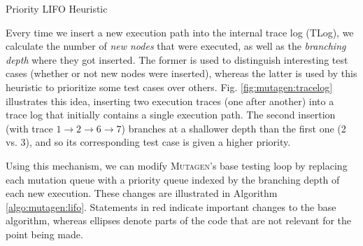 \documentclass[sigconf,review,anonymous]{acmart}
\newcommand{\mutagen}{\textsc{Mutagen}\xspace}
\begin{document}
\begin{algorithm}[t]
  \SetAlgoLined
  \DontPrintSemicolon

\caption{\label{algo:mutagen:lifo}Priority LIFO Heuristic}
\end{algorithm}


Every time we insert a new execution path into the internal trace log (TLog), we
calculate the number of \emph{new nodes} that were executed, as well as the
\emph{branching depth} where they got inserted.
%
The former is used to distinguish interesting test cases (whether or not new
nodes were inserted), whereas the latter is used by this heuristic to prioritize
some test cases over others.
%
Fig. \ref{fig:mutagen:tracelog} illustrates this idea, inserting two execution
traces (one after another) into a trace log that initially contains a single
execution path.
%
The second insertion (with trace $1 \rightarrow 2 \rightarrow 6 \rightarrow 7$)
branches at a shallower depth than the first one (2 vs. 3), and so its
corresponding test case is given a higher priority.


Using this mechanism, we can modify \mutagen's base testing loop by replacing
each mutation queue with a priority queue indexed by the branching depth of each
new execution.
%
These changes are illustrated in Algorithm \ref{algo:mutagen:lifo}.
%
Statements in {\color{red} red} indicate important changes to the base
algorithm, whereas ellipses denote parts of the code that are not relevant for
the point being made.
\end{document}
